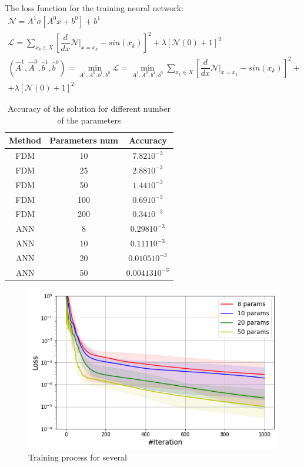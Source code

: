 The loss function for the training neural network:
\begin{equation}
	\begin{multlined}
		\mathcal{N} = A^1 \sigma \left [ A^0 x + b^0 \right ] + b^1 \\
		\mathcal{L} = \sum_{x_k \in X} \left [ \dfrac{d}{d x} \mathcal{N} \big|_{x = x_k} - sin(x_k) \right ]^2 + \lambda \left [  \mathcal{N} \left( 0 \right ) + 1 \right ]^2 \\
		\left ( \hat{A}^1, \hat{A}^0, \hat{b}^1, \hat{b}^0 \right ) = \min_{A^1, A^0, b^1, b^0} \mathcal{L} = \min_{A^1, A^0, b^1, b^0} \sum_{x_k \in X} \left [ \dfrac{d}{d x} \mathcal{N} \big|_{x = x_k} - sin(x_k) \right ]^2 + \\ + \lambda \left [  \mathcal{N} \left( 0 \right ) + 1 \right ]^2
	\end{multlined}
\end{equation}

\begin{table}
	\centering
	\begin{tabular}{| c | c | c |} 
	\hline
		Method & Parameters num & Accuracy \\
		\hline FDM & 10  & $7.82 10^{-3}$  \\ 
		FDM & 25  & $2.88 10^{-3}$  \\
		FDM & 50  & $1.44 10^{-3}$  \\
		FDM & 100  & $0.69 10^{-3}$ \\
		FDM & 200  & $0.34 10^{-3}$ \\
		ANN & 8  & $0.298 10^{-3}$  \\
		ANN & 10  & $0.111 10^{-3}$ \\
		ANN & 20  & $0.0105 10^{-3}$  \\
		ANN & 50  & $0.00413 10^{-3}$ \\ \hline
	\end{tabular}
	\caption{Accuracy of the solution for different number of the parameters}
	\label{table:ode1_tab}
\end{table}

\begin{figure}[h]
	\centering
	\includegraphics[width=\textwidth]{images/chapter2/ode1-training-info.png}
	\caption{Training process for several}
	\label{fig:ode1}
\end{figure}

